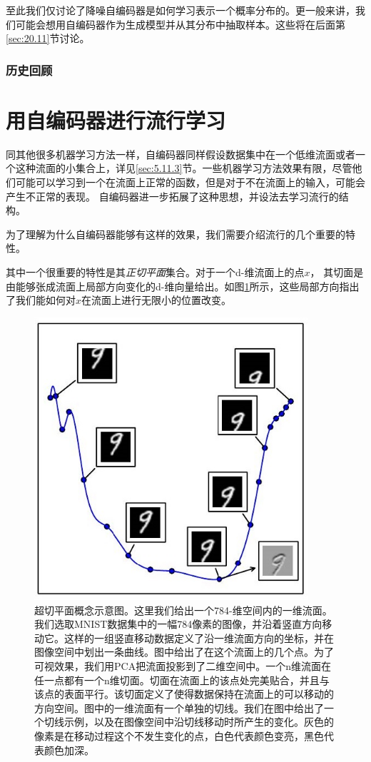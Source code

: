 至此我们仅讨论了降噪自编码器是如何学习表示一个概率分布的。更一般来讲，我们可能会想用自编码器作为生成模型并从其分布中抽取样本。这些将在后面第\ref{sec:20.11}节讨论。

\subsubsection{历史回顾}
\label{sec:14.5.1.1}

\section{用自编码器进行流行学习}
\label{sec:14.6}

同其他很多机器学习方法一样，自编码器同样假设数据集中在一个低维流面或者一个这种流面的小集合上，详见\ref{sec:5.11.3}节。一些机器学习方法效果有限，尽管他们可能可以学习到一个在流面上正常的函数，但是对于不在流面上的输入，可能会产生不正常的表现。
自编码器进一步拓展了这种思想，并设法去学习流行的结构。

为了理解为什么自编码器能够有这样的效果，我们需要介绍流行的几个重要的特性。

其中一个很重要的特性是其\emph{正切平面}集合。对于一个d-维流面上的点$x$， 其切面是由能够张成流面上局部方向变化的d-维向量给出。如图\ref{fig:14.6}所示，这些局部方向指出了我们能如何对$x$在流面上进行无限小的位置改变。
\begin{figure}[htbp] %
   \centering
   \includegraphics[width=4in]{fig/chap14/14_6.jpg} 
   \caption{超切平面概念示意图。这里我们给出一个784-维空间内的一维流面。我们选取MNIST数据集中的一幅784像素的图像，并沿着竖直方向移动它。这样的一组竖直移动数据定义了沿一维流面方向的坐标，并在图像空间中划出一条曲线。图中给出了在这个流面上的几个点。为了可视效果，我们用PCA把流面投影到了二维空间中。一个n维流面在任一点都有一个n维切面。切面在流面上的该点处完美贴合，并且与该点的表面平行。该切面定义了使得数据保持在流面上的可以移动的方向空间。图中的一维流面有一个单独的切线。我们在图中给出了一个切线示例，以及在图像空间中沿切线移动时所产生的变化。灰色的像素是在移动过程这个不发生变化的点，白色代表颜色变亮，黑色代表颜色加深。}
   \label{fig:14.6}
\end{figure}


